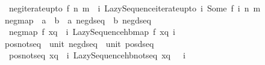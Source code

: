 \begin{isabellebody}
\isanewline
\ \ {\isachardoublequoteopen}neg{\isacharunderscore}{\kern0pt}iterate{\isacharunderscore}{\kern0pt}upto\ f\ n\ m\ {\isacharequal}{\kern0pt}\ {\isacharparenleft}{\kern0pt}{\isasymlambda}i{\isachardot}{\kern0pt}\ Lazy{\isacharunderscore}{\kern0pt}Sequence{\isachardot}{\kern0pt}iterate{\isacharunderscore}{\kern0pt}upto\ {\isacharparenleft}{\kern0pt}{\isasymlambda}i{\isachardot}{\kern0pt}\ Some\ {\isacharparenleft}{\kern0pt}f\ i{\isacharparenright}{\kern0pt}{\isacharparenright}{\kern0pt}\ n\ m{\isacharparenright}{\kern0pt}{\isachardoublequoteclose}\isanewline
\isanewline
{}\isamarkupfalse%
\ neg{\isacharunderscore}{\kern0pt}map\ {\isacharcolon}{\kern0pt}{\isacharcolon}{\kern0pt}\ {\isachardoublequoteopen}{\isacharparenleft}{\kern0pt}{\isacharprime}{\kern0pt}a\ {\isasymRightarrow}\ {\isacharprime}{\kern0pt}b{\isacharparenright}{\kern0pt}\ {\isasymRightarrow}\ {\isacharprime}{\kern0pt}a\ neg{\isacharunderscore}{\kern0pt}dseq\ {\isasymRightarrow}\ {\isacharprime}{\kern0pt}b\ neg{\isacharunderscore}{\kern0pt}dseq{\isachardoublequoteclose}\isanewline
{}\isanewline
\ \ {\isachardoublequoteopen}neg{\isacharunderscore}{\kern0pt}map\ f\ xq\ {\isacharequal}{\kern0pt}\ {\isacharparenleft}{\kern0pt}{\isasymlambda}i{\isachardot}{\kern0pt}\ Lazy{\isacharunderscore}{\kern0pt}Sequence{\isachardot}{\kern0pt}hb{\isacharunderscore}{\kern0pt}map\ f\ {\isacharparenleft}{\kern0pt}xq\ i{\isacharparenright}{\kern0pt}{\isacharparenright}{\kern0pt}{\isachardoublequoteclose}%
\isadelimdocument
%
\endisadelimdocument
%
\isatagdocument
%
\isamarkuptrue%
%
\endisatagdocument
{\isafolddocument}%
%
\isadelimdocument
%
\endisadelimdocument
{}\isamarkupfalse%
\ pos{\isacharunderscore}{\kern0pt}not{\isacharunderscore}{\kern0pt}seq\ {\isacharcolon}{\kern0pt}{\isacharcolon}{\kern0pt}\ {\isachardoublequoteopen}unit\ neg{\isacharunderscore}{\kern0pt}dseq\ {\isasymRightarrow}\ unit\ pos{\isacharunderscore}{\kern0pt}dseq{\isachardoublequoteclose}\isanewline
{}\isanewline
\ \ {\isachardoublequoteopen}pos{\isacharunderscore}{\kern0pt}not{\isacharunderscore}{\kern0pt}seq\ xq\ {\isacharequal}{\kern0pt}\ {\isacharparenleft}{\kern0pt}{\isasymlambda}i{\isachardot}{\kern0pt}\ Lazy{\isacharunderscore}{\kern0pt}Sequence{\isachardot}{\kern0pt}hb{\isacharunderscore}{\kern0pt}not{\isacharunderscore}{\kern0pt}seq\ {\isacharparenleft}{\kern0pt}xq\ {\isacharparenleft}{\kern0pt}{}\ {\isacharasterisk}{\kern0pt}\ i{\isacharparenright}{\kern0pt}{\isacharparenright}{\kern0pt}{\isacharparenright}{\kern0pt}{\isachardoublequoteclose}\isanewline

\end{isabellebody}
